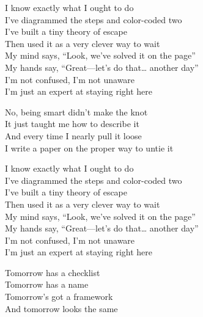 \begin{lyrics}
I know exactly what I ought to do\\
I’ve diagrammed the steps and color-coded two\\
I’ve built a tiny theory of escape\\
Then used it as a very clever way to wait\\
My mind says, “Look, we’ve solved it on the page”\\
My hands say, “Great—let’s do that… another day”\\
I’m not confused, I’m not unaware\\
I’m just an expert at staying right here

No, being smart didn’t make the knot\\
It just taught me how to describe it\\
And every time I nearly pull it loose\\
I write a paper on the proper way to untie it

I know exactly what I ought to do\\
I’ve diagrammed the steps and color-coded two\\
I’ve built a tiny theory of escape\\
Then used it as a very clever way to wait\\
My mind says, “Look, we’ve solved it on the page”\\
My hands say, “Great—let’s do that… another day”\\
I’m not confused, I’m not unaware\\
I’m just an expert at staying right here

Tomorrow has a checklist\\
Tomorrow has a name\\
Tomorrow’s got a framework\\
And tomorrow looks the same
\end{lyrics}


